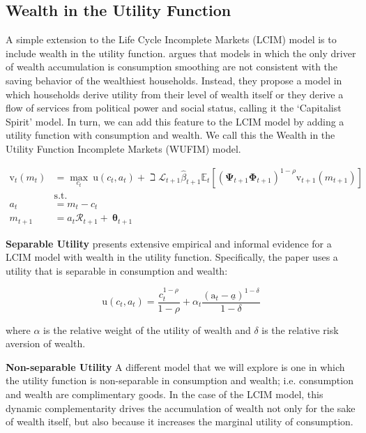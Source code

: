 \documentclass{article}
\newcommand{\DiscFac}{\beta}
\newcommand{\uFunc}{\mathrm{u}}
\newcommand{\vFunc}{\mathrm{v}}
\newcommand{\Alive}{\mathcal{L}}
\newcommand{\Ex}{\mathbb{E}}
\newcommand{\CRRA}{\rho}
\newcommand{\PermGroFac}{\pmb{\Phi}}
\newcommand{\PermShk}{\mathbf{\Psi}}
\newcommand{\aNrm}{a}
\newcommand{\cNrm}{c}
\newcommand{\RNrm}{\mathcal{R}}
\newcommand{\TranShkEmp}{\pmb{\theta}}
\newcommand{\aFunc}{\mathrm{a}}
\newcommand{\kapShare}{\alpha}
\newcommand{\wealthShare}{\delta}
\begin{document}
\subsection{Wealth in the Utility Function}\label{Wealth in the Utility Function}

A simple extension to the Life Cycle Incomplete Markets (LCIM) model is to include wealth in the utility function. \cite{Carroll_1998} argues that models in which the only driver of wealth accumulation is consumption smoothing are not consistent with the saving behavior of the wealthiest households. Instead, they propose a model in which households derive utility from their level of wealth itself or they derive a flow of services from political power and social status, calling it the `Capitalist Spirit' model. In turn, we can add this feature to the LCIM model by adding a utility function with consumption and wealth. We call this the Wealth in the Utility Function Incomplete Markets (WUFIM) model.

\begin{equation}
\begin{align}
    {\vFunc}_{t}({m}_{t}) & = \max_{\cNrm_{t}} ~ \uFunc(\cNrm_{t}, \aNrm_{t})+\beth\Alive_{t+1}\hat{\DiscFac}_{t+1}
    \Ex_{t}[(\PermShk_{t+1}\PermGroFac_{t+1})^{1-\CRRA}{\vFunc}_{t+1}({m}_{t+1})]
    \\ & \text{s.t.} &
    \\ \aNrm_{t} & = {m}_{t}-\cNrm_{t}
    \\ {m}_{t+1} & = \aNrm_{t}\RNrm_{t+1}+ ~\TranShkEmp_{t+1}
\end{align}
\end{equation}

\textbf{Separable Utility} \cite{Carroll_1998} presents extensive empirical and informal evidence for a LCIM model with wealth in the utility function. Specifically, the paper uses a utility that is separable in consumption and wealth:

\begin{equation}
\uFunc(\cNrm_{t}, \aNrm_{t}) = \frac{\cNrm_{t}^{1-\CRRA}}{1-\CRRA}
    + \kapShare_{t} \frac{(\aFunc_{t} - \underline\aNrm)^{1-\wealthShare}}{1-\wealthShare}
\end{equation}

where $\kapShare$ is the relative weight of the utility of wealth and $\wealthShare$ is the relative risk aversion of wealth.

\textbf{Non-separable Utility} A different model that we will explore is one in which the utility function is non-separable in consumption and wealth; i.e. consumption and wealth are complimentary goods. In the case of the LCIM model, this dynamic complementarity drives the accumulation of wealth not only for the sake of wealth itself, but also because it increases the marginal utility of consumption.
\end{document}
